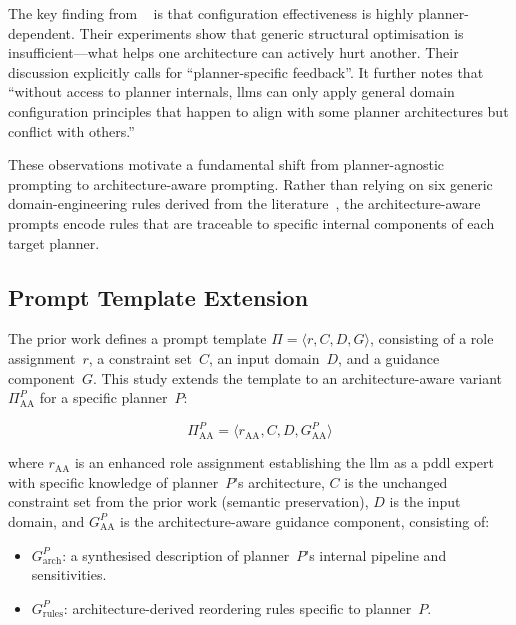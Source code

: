 The key finding from \citeauthor{Georgievski2025}~\cite{Georgievski2025} is that configuration effectiveness is highly planner-dependent.
Their experiments show that generic structural optimisation is insufficient---what helps one architecture can actively hurt another.
Their discussion explicitly calls for ``planner-specific feedback''. It further notes that ``without access to planner internals, \glspl{llm} can only apply general domain configuration principles that happen to align with some planner architectures but conflict with others.''

These observations motivate a fundamental shift from planner-agnostic prompting to architecture-aware prompting.
Rather than relying on six generic domain-engineering rules derived from the literature~\cite{Vallati2021, Franco2019, FoxLong2003, Helmert2009, McCluskey2017}, the architecture-aware prompts encode rules that are traceable to specific internal components of each target planner.

\subsection{Prompt Template Extension}

The prior work defines a prompt template $\Pi = \langle r, C, D, G \rangle$, consisting of a role assignment~$r$, a constraint set~$C$, an input domain~$D$, and a guidance component~$G$.
This study extends the template to an architecture-aware variant $\Pi_\text{AA}^{P}$ for a specific planner~$P$:

\begin{equation}
  \Pi_\text{AA}^{P} = \langle r_\text{AA}, C, D, G_\text{AA}^{P} \rangle
\end{equation}

\noindent where $r_\text{AA}$ is an enhanced role assignment establishing the \gls{llm} as a \gls{pddl} expert with specific knowledge of planner~$P$'s architecture, $C$ is the unchanged constraint set from the prior work (semantic preservation), $D$ is the input domain, and $G_\text{AA}^{P}$ is the architecture-aware guidance component, consisting of:
\begin{itemize}
  \item $G_\text{arch}^{P}$: a synthesised description of planner~$P$'s internal pipeline and sensitivities.
  \item $G_\text{rules}^{P}$: architecture-derived reordering rules specific to planner~$P$.
\end{itemize}


